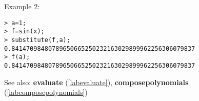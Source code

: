 \noindent Example 2: 
\begin{center}\begin{minipage}{15cm}\begin{Verbatim}[frame=single]
> a=1;
> f=sin(x);
> substitute(f,a);
0.84147098480789650665250232163029899962256306079837
> f(a);
0.84147098480789650665250232163029899962256306079837
\end{Verbatim}
\end{minipage}\end{center}
See also: \textbf{evaluate} (\ref{labevaluate}), \textbf{composepolynomials} (\ref{labcomposepolynomials})
